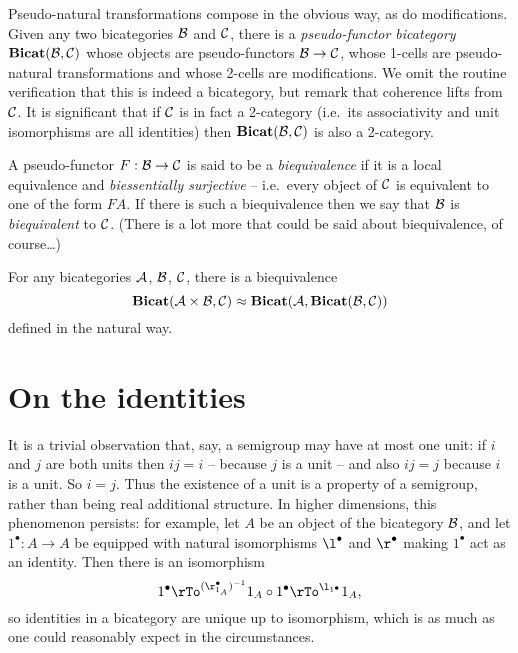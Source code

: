 \documentclass{robinthesisdraft}
\begin{document}
Pseudo-natural transformations compose in the obvious way, as do modifications.
Given any two bicategories $\mathcal{B}$ and $\mathcal{C}$, there is a \emph{pseudo-functor bicategory}
$\mathbf{Bicat}(\mathcal{B},\mathcal{C})$ whose objects are pseudo-functors $\mathcal{B}\to\mathcal{C}$,
whose 1-cells are pseudo-natural transformations and whose
2-cells are modifications. We omit the routine verification that
this is indeed a bicategory, but remark that coherence lifts from
$\mathcal{C}$. It is significant that if $\mathcal{C}$ is in fact a 2-category
(i.e.\ its associativity and unit isomorphisms are all identities) then
$\mathbf{Bicat}(\mathcal{B},\mathcal{C})$ is also a 2-category.

A pseudo-functor $F:\mathcal{B}\to\mathcal{C}$ is said to be a \emph{biequivalence}
if it is a local equivalence and \emph{biessentially surjective} -- i.e.\ every
object of $\mathcal{C}$ is equivalent to one of the form $FA$. If there is such a
biequivalence then we say that $\mathcal{B}$ is \emph{biequivalent} to $\mathcal{C}$.
(There is a lot more that could be said about biequivalence, of course\dots)

For any bicategories $\mathcal{A}$, $\mathcal{B}$, $\mathcal{C}$, there is a biequivalence
\[
	\mathbf{Bicat}(\mathcal{A}\times\mathcal{B}, \mathcal{C}) \approx \mathbf{Bicat}(\mathcal{A}, \mathbf{Bicat}(\mathcal{B},\mathcal{C}))
\]
defined in the natural way.
% 

\section{On the identities}
It is a trivial observation that, say, a semigroup may have at
most one unit: if $i$ and $j$ are both units then $ij=i$ -- because
$j$ is a unit -- and also $ij=j$ because $i$ is a unit. So $i=j$.
Thus the existence of a unit is a property of a semigroup, rather
than being real additional structure. In higher dimensions, this
phenomenon persists: for example, let
$A$ be an object of the bicategory $\mathcal{B}$, and let $1^\bullet: A\to A$
be equipped with natural isomorphisms $\l^{\bullet}$ and $\r^{\bullet}$
making $1^{\bullet}$ act as an identity. Then there is an isomorphism
\[
	1^{\bullet} \rTo^{(\r^{\bullet}_{1_{A}})^{-1}} 1_{A}\o 1^{\bullet}
		\rTo^{\l_{1^{\bullet}}} 1_{A},
\]
so identities in a bicategory are unique up to isomorphism, which
is as much as one could reasonably expect in the circumstances.
\end{document}

